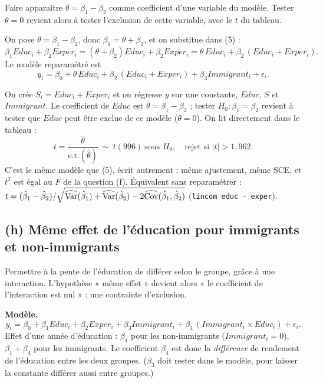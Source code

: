 \documentclass[11pt,a4paper]{article}
\begin{document}
\begin{idee}
Faire apparaître $\theta=\beta_1-\beta_2$ comme coefficient d'une variable du modèle. Tester $\theta=0$ revient alors à tester l'exclusion de cette variable, avec le $t$ du tableau.
\end{idee}

On pose $\theta=\beta_1-\beta_2$, donc $\beta_1=\theta+\beta_2$, et on substitue dans (5) :
\[
\beta_1Educ_i+\beta_2Exper_i=(\theta+\beta_2)Educ_i+\beta_2Exper_i=\theta\,Educ_i+\beta_2\,(Educ_i+Exper_i).
\]
Le modèle reparamétré est
\[
y_i=\beta_0+\theta\,Educ_i+\beta_2\,(Educ_i+Exper_i)+\beta_3Immigrant_i+\epsilon_i .
\]

\begin{reponse}
On crée $S_i=Educ_i+Exper_i$ et on régresse $y$ sur une constante, $Educ$, $S$ et $Immigrant$. Le coefficient de $Educ$ est $\theta=\beta_1-\beta_2$ ; tester $H_0:\beta_1=\beta_2$ revient à tester que $Educ$ peut être exclue de ce modèle ($\theta=0$). On lit directement dans le tableau :
\[
t=\frac{\hat\theta}{\text{e.t.}(\hat\theta)}\ \sim\ t(996)\ \text{sous }H_0,\quad\text{rejet si }|t|>1{,}962 .
\]
C'est le même modèle que (5), écrit autrement : même ajustement, même SCE, et $t^2$ est égal au $F$ de la question (f). Équivalent sans reparamétrer : $t=(\hat\beta_1-\hat\beta_2)/\sqrt{\widehat{\operatorname{Var}}(\hat\beta_1)+\widehat{\operatorname{Var}}(\hat\beta_2)-2\widehat{\operatorname{Cov}}(\hat\beta_1,\hat\beta_2)}$ (\texttt{lincom educ - exper}).
\end{reponse}

\subsection*{(h) Même effet de l'éducation pour immigrants et non-immigrants}

\begin{idee}
Permettre à la pente de l'éducation de différer selon le groupe, grâce à une interaction. L'hypothèse « même effet » devient alors « le coefficient de l'interaction est nul » : une contrainte d'exclusion.
\end{idee}

\textbf{Modèle.}
\[
y_i=\beta_0+\beta_1Educ_i+\beta_2Exper_i+\beta_3Immigrant_i+\beta_4\,(Immigrant_i\times Educ_i)+\epsilon_i .
\]
Effet d'une année d'éducation : $\beta_1$ pour les non-immigrants ($Immigrant_i=0$), $\beta_1+\beta_4$ pour les immigrants. Le coefficient $\beta_4$ est donc la \emph{différence} de rendement de l'éducation entre les deux groupes. ($\beta_3$ doit rester dans le modèle, pour laisser la constante différer aussi entre groupes.)
\end{document}
